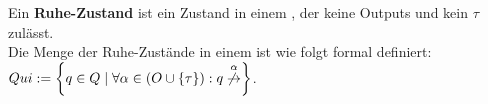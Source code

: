 \begin{frame}
  \begin{Def}[Ruhe]
    Ein \textbf{Ruhe-Zustand} ist ein Zustand in einem \EIO{}, der keine
    Outputs und kein $\tau$ zulässt.\\
    Die Menge der Ruhe-Zustände in einem \EIO{} ist wie folgt formal definiert:
    $Qui := \left\{q\in Q\mid\forall\alpha\in (O\cup\{\tau\}):
  q\overset{\alpha}{\not{\hspace{-0.1cm}\rightarrow}}\right\}$.
  \end{Def}
\end{frame}
